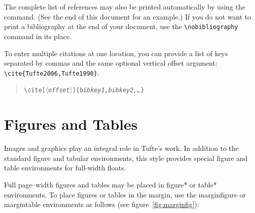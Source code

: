 \documentclass{tufte-handout}
\newcommand{\doccmd}[1]{\texttt{\textbackslash#1}}%
\newcommand{\docopt}[1]{\ensuremath{\langle}\textrm{\textit{#1}}\ensuremath{\rangle}}%
\newcommand{\docarg}[1]{\textrm{\textit{#1}}}%
\newcommand{\docenv}[1]{\textsf{#1}}%
\newenvironment{docspec}{\begin{quote}\noindent}{\end{quote}}%
\begin{document}
The complete list of references may also be printed automatically by using
the \Verb|| command.  (See the end of this document for an
example.)  If you do not want to print a bibliography at the end of your
document, use the \Verb|\nobibliography| command in its place.  

To enter multiple citations at one location,\cite{Tufte2006,Tufte1990} you can
provide a list of keys separated by commas and the same optional vertical
offset argument: \Verb|\cite{Tufte2006,Tufte1990}|.  
\begin{docspec}
  \doccmd{cite[\docopt{offset}]\{\docarg{bibkey1,bibkey2,\ldots}\}}
\end{docspec}

\section{Figures and Tables}\label{sec:figures-and-tables}
Images and graphics play an integral role in Tufte's work.
In addition to the standard \docenv{figure} and \docenv{tabular} environments,
this style provides special figure and table environments for full-width
floats.

Full page--width figures and tables may be placed in \docenv{figure*} or
\docenv{table*} environments.  To place figures or tables in the margin,
use the \docenv{marginfigure} or \docenv{margintable} environments as follows
(see figure~\ref{fig:marginfig}):
\end{document}
